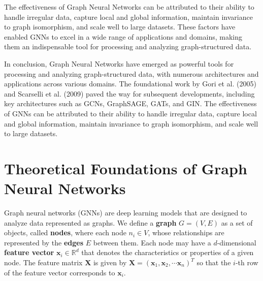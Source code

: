 \documentclass[final]{article}
\begin{document}
The effectiveness of Graph Neural Networks can be attributed to their ability to handle irregular data, capture local and global information, maintain invariance to graph isomorphism, and scale well to large datasets. These factors have enabled GNNs to excel in a wide range of applications and domains, making them an indispensable tool for processing and analyzing graph-structured data.

In conclusion, Graph Neural Networks have emerged as powerful tools for processing and analyzing graph-structured data, with numerous architectures and applications across various domains. The foundational work by Gori et al. (2005) and Scarselli et al. (2009) paved the way for subsequent developments, including key architectures such as GCNs, GraphSAGE, GATs, and GIN. The effectiveness of GNNs can be attributed to their ability to handle irregular data, capture local and global information, maintain invariance to graph isomorphism, and scale well to large datasets.

\newpage 

\section{Theoretical Foundations of Graph Neural Networks} %
Graph neural networks (GNNs) are deep learning models that are designed to analyze data represented as graphs. We define a \textbf{graph} $G = (V, E)$ as a set of objects, called \textbf{nodes}, where each node $n_i \in V$, whose relationships are represented by the \textbf{edges} $E$ between them. Each node may have a $d$-dimensional \textbf{feature vector} $\textbf{x}_i \in \mathbb{R}^d$ that denotes the characteristics or properties of a given node. The feature matrix $\textbf{X}$ is given by $\textbf{X} = (\textbf{x}_1, \textbf{x}_2, \cdots \textbf{x}_n)^T$ so that the $i$-th row of the feature vector corresponds to $\textbf{x}_i$. 
\end{document}

